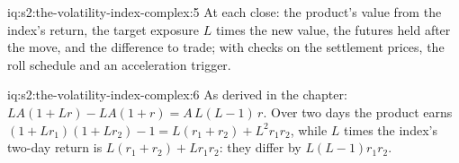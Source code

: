 \begin{solution}{iq:s2:the-volatility-index-complex:5}
At each close: the product's value from the index's return, the target exposure $L$ times the new value, the futures held after the move, and the
difference to trade; with checks on the settlement prices, the roll schedule and an acceleration trigger.
\end{solution}

\begin{solution}{iq:s2:the-volatility-index-complex:6}
As derived in the chapter: $LA(1 + Lr) - LA(1 + r) = A\,L(L - 1)\,r$. Over two days the product earns $(1 + Lr_1)(1 + Lr_2) - 1 = L(r_1 + r_2) +
L^2 r_1 r_2$, while $L$ times the index's two-day return is $L(r_1 + r_2) + L r_1 r_2$: they differ by $L(L - 1)r_1 r_2$.
\end{solution}
